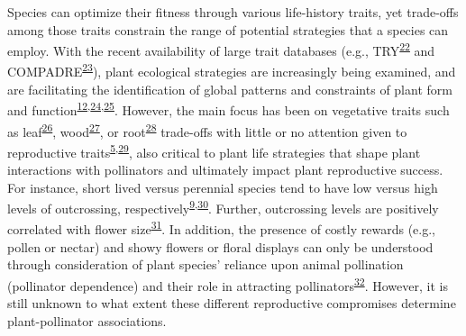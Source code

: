 \documentclass[12pt,a4paper,]{article}
\begin{document}
Species can optimize their fitness through various life-history traits,
yet trade-offs among those traits constrain the range of potential
strategies that a species can employ. With the recent availability of
large trait databases (e.g.,
TRY\textsuperscript{\protect\hyperlink{ref-kattge2011}{22}} and
COMPADRE\textsuperscript{\protect\hyperlink{ref-salguero2015}{23}}),
plant ecological strategies are increasingly being examined, and are
facilitating the identification of global patterns and constraints of
plant form and
function\textsuperscript{\protect\hyperlink{ref-salguero2016}{12},\protect\hyperlink{ref-diaz2016}{24},\protect\hyperlink{ref-carmona2021}{25}}.
However, the main focus has been on vegetative traits such as
leaf\textsuperscript{\protect\hyperlink{ref-wright2004}{26}},
wood\textsuperscript{\protect\hyperlink{ref-chave2009}{27}}, or
root\textsuperscript{\protect\hyperlink{ref-laughlin2021}{28}}
trade-offs with little or no attention given to reproductive
traits\textsuperscript{\protect\hyperlink{ref-roddy2021}{5},\protect\hyperlink{ref-evojtko2020}{29}},
also critical to plant life strategies that shape plant interactions
with pollinators and ultimately impact plant reproductive success. For
instance, short lived versus perennial species tend to have low versus
high levels of outcrossing,
respectively\textsuperscript{\protect\hyperlink{ref-moeller2017}{9},\protect\hyperlink{ref-barrett2003}{30}}.
Further, outcrossing levels are positively correlated with flower
size\textsuperscript{\protect\hyperlink{ref-goodwillie2010}{31}}. In
addition, the presence of costly rewards (e.g., pollen or nectar) and
showy flowers or floral displays can only be understood through
consideration of plant species' reliance upon animal pollination
(pollinator dependence) and their role in attracting
pollinators\textsuperscript{\protect\hyperlink{ref-ollerton2011}{32}}.
However, it is still unknown to what extent these different reproductive
compromises determine plant-pollinator associations.
\end{document}
